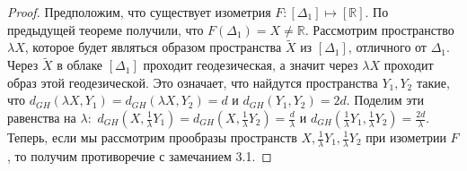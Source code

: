 \begin{proof}
	Предположим, что существует изометрия $F\colon$$[\Delta_1] \mapsto [\mathbb{R}]$. По предыдущей теореме получили, что $F(\Delta_1) = X \neq \mathbb{R}$. Рассмотрим пространство $\lambda X$, которое будет являться образом пространства $\widetilde{X}$ из $[\Delta_1]$, отличного от $\Delta_1$. Через $\widetilde{X}$ в облаке $[\Delta_1]$ проходит геодезическая, а значит через $\lambda X$ проходит образ этой геодезической. Это означает, что найдутся пространства $Y_1, Y_2$ такие, что $d_{GH}(\lambda X, Y_1) = d_{GH}(\lambda X, Y_2) = d$ и $d_{GH}(Y_1, Y_2) = 2d$. Поделим эти равенства на $\lambda: $ $d_{GH}(X, \frac{1}{\lambda} Y_1) = d_{GH}(X, \frac{1}{\lambda} Y_2) = \frac{d}{\lambda}$ и $d_{GH}(\frac{1}{\lambda} Y_1, \frac{1}{\lambda} Y_2) = \frac{2d}{\lambda}$. Теперь, если мы рассмотрим прообразы пространств $X, \frac{1}{\lambda} Y_1, \frac{1}{\lambda} Y_2$ при изометрии $F$, то получим противоречие с замечанием 3.1.
\end{proof}



